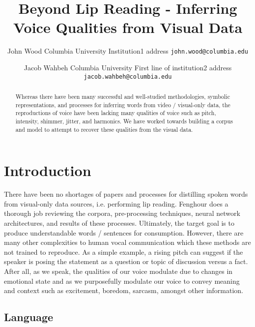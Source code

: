 \documentclass[10pt,twocolumn,letterpaper]{article}
\begin{document}
\title{Beyond Lip Reading - Inferring Voice Qualities from Visual Data}

\author{John Wood
Columbia University
Institution1 address
{\tt\small john.wood@columbia.edu}
\and Jacob Wahbeh
Columbia University
First line of institution2 address
{\tt\small jacob.wahbeh@columbia.edu}
}
\maketitle

\begin{abstract}
   Whereas there have been many successful and well-studied methodologies, symbolic representations, and processes for inferring words from video / visual-only data, the reproductions of voice have been lacking many qualities of voice such as pitch, intensity, shimmer, jitter, and harmonics. We have worked towards building a corpus and model to attempt to recover these qualities from the visual data.
\end{abstract}

\section{Introduction}
\label{sec:intro}

There have been no shortages of papers and processes for distilling spoken words from visual-only data sources, i.e. performing lip reading. Fenghour  \cite{Fenghour2021} does a thorough job reviewing the corpora, pre-processing techniques, neural network architectures, and results of these processes. Ultimately, the target goal is to produce understandable words / sentences for consumption. However, there are many other complexities to human vocal communication which these methods are not trained to reproduce. As a simple example, a rising pitch can suggest if the speaker is posing the statement as a question or topic of discussion versus a fact. After all, as we speak, the qualities of our voice modulate due to changes in emotional state and as we purposefully modulate our voice to convey meaning and context such as excitement, boredom, sarcasm, amongst other information. 

\subsection{Language}
\end{document}
